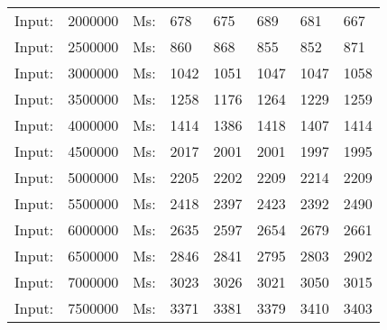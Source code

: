 \documentclass[11pt,a4paper]{report}
\begin{document}
\begin{tiny}
\begin{tabular}{l l ||l  l  l  l  l  l}
Input:&2000000&Ms:&678&675&689&681&667\\
Input:&2500000&Ms:&860&868&855&852&871\\
Input:&3000000&Ms:&1042&1051&1047&1047&1058\\
Input:&3500000&Ms:&1258&1176&1264&1229&1259\\
Input:&4000000&Ms:&1414&1386&1418&1407&1414\\
Input:&4500000&Ms:&2017&2001&2001&1997&1995\\
Input:&5000000&Ms:&2205&2202&2209&2214&2209\\
Input:&5500000&Ms:&2418&2397&2423&2392&2490\\
Input:&6000000&Ms:&2635&2597&2654&2679&2661\\
Input:&6500000&Ms:&2846&2841&2795&2803&2902\\
Input:&7000000&Ms:&3023&3026&3021&3050&3015\\
Input:&7500000&Ms:&3371&3381&3379&3410&3403\\
\end{tabular}


\end{tiny}
\end{document}
